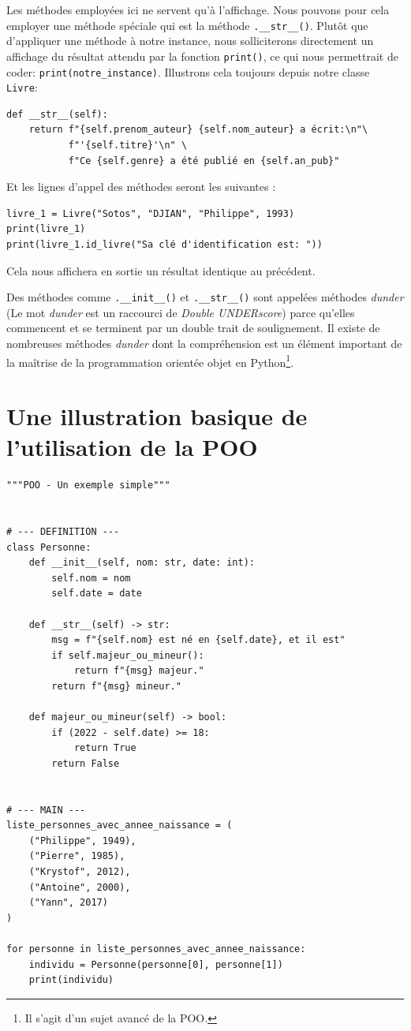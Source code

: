 \documentclass[a4paper,12pt]{book}
\begin{document}
Les méthodes employées ici ne servent qu'à l'affichage. Nous pouvons pour cela employer une méthode spéciale qui est la méthode \texttt{.\_\_str\_\_()}. Plutôt que d'appliquer une méthode à notre instance, nous solliciterons directement un affichage du résultat attendu par la fonction \texttt{print()}, ce qui nous permettrait de coder:  \texttt{print(notre\_instance)}. Illustrons cela toujours depuis notre classe \texttt{Livre}:
\begin{lstlisting}[caption=La méthode  \texttt{.\_\_str\_\_()}]
def __str__(self):
    return f"{self.prenom_auteur} {self.nom_auteur} a écrit:\n"\
           f"'{self.titre}'\n" \
           f"Ce {self.genre} a été publié en {self.an_pub}"
\end{lstlisting}
\medskip

Et les lignes d’appel des méthodes seront les suivantes :
\begin{lstlisting}[caption=Appel de la méthode  \texttt{.\_\_str\_\_()}]
livre_1 = Livre("Sotos", "DJIAN", "Philippe", 1993)
print(livre_1)
print(livre_1.id_livre("Sa clé d'identification est: "))
\end{lstlisting}
\medskip

Cela nous affichera en sortie un résultat identique au précédent.
\medskip

Des méthodes comme \texttt{.\_\_init\_\_()} et \texttt{.\_\_str\_\_()} sont appelées méthodes \textit{dunder} (Le mot \textit{dunder} est un raccourci de \textit{Double UNDERscore}) parce qu'elles commencent et se terminent par un double trait de soulignement. Il existe de nombreuses méthodes \textit{dunder} dont la compréhension est un élément important de la maîtrise de la programmation orientée objet en Python\footnote{Il s'agit d'un sujet avancé de la POO.}.
\medskip

\section{Une illustration basique de l'utilisation de la POO}
\begin{lstlisting}[caption=Quel est l'âge de chacun ?]
"""POO - Un exemple simple"""


# --- DEFINITION ---
class Personne:
    def __init__(self, nom: str, date: int):
        self.nom = nom
        self.date = date

    def __str__(self) -> str:
        msg = f"{self.nom} est né en {self.date}, et il est"
        if self.majeur_ou_mineur():
            return f"{msg} majeur."
        return f"{msg} mineur."

    def majeur_ou_mineur(self) -> bool:
        if (2022 - self.date) >= 18:
            return True
        return False


# --- MAIN ---
liste_personnes_avec_annee_naissance = (
    ("Philippe", 1949),
    ("Pierre", 1985),
    ("Krystof", 2012),
    ("Antoine", 2000),
    ("Yann", 2017)
)

for personne in liste_personnes_avec_annee_naissance:
    individu = Personne(personne[0], personne[1])
    print(individu)
\end{lstlisting}
\medskip
\end{document}
